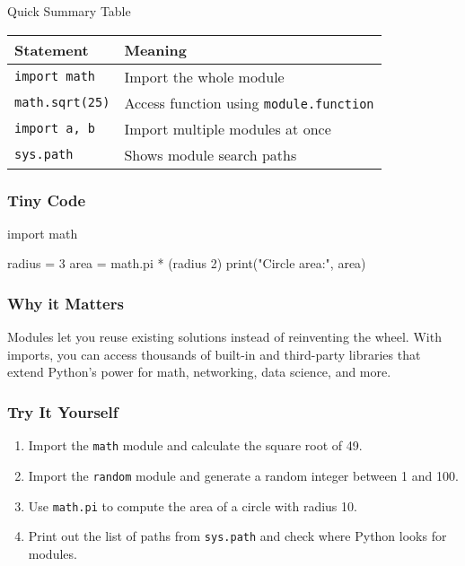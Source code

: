 \documentclass[
  letterpaper,
  DIV=11,
  numbers=noendperiod]{scrreprt}
\newenvironment{Shaded}{\begin{snugshade}}{\end{snugshade}}
\newcommand{\BuiltInTok}[1]{\textcolor[rgb]{0.00,0.23,0.31}{#1}}
\newcommand{\DecValTok}[1]{\textcolor[rgb]{0.68,0.00,0.00}{#1}}
\newcommand{\ImportTok}[1]{\textcolor[rgb]{0.00,0.46,0.62}{#1}}
\newcommand{\NormalTok}[1]{\textcolor[rgb]{0.00,0.23,0.31}{#1}}
\newcommand{\OperatorTok}[1]{\textcolor[rgb]{0.37,0.37,0.37}{#1}}
\newcommand{\StringTok}[1]{\textcolor[rgb]{0.13,0.47,0.30}{#1}}
\providecommand{\tightlist}{%
  \setlength{\itemsep}{0pt}\setlength{\parskip}{0pt}}
\begin{document}
Quick Summary Table

\begin{longtable}[]{@{}ll@{}}
\toprule\noalign{}
Statement & Meaning \\
\midrule\noalign{}
\endhead
\bottomrule\noalign{}
\endlastfoot
\texttt{import\ math} & Import the whole module \\
\texttt{math.sqrt(25)} & Access function using
\texttt{module.function} \\
\texttt{import\ a,\ b} & Import multiple modules at once \\
\texttt{sys.path} & Shows module search paths \\
\end{longtable}

\subsubsection{Tiny Code}\label{tiny-code-40}

\begin{Shaded}
\begin{Highlighting}[]
\ImportTok{import}\NormalTok{ math}

\NormalTok{radius }\OperatorTok{=} \DecValTok{3}
\NormalTok{area }\OperatorTok{=}\NormalTok{ math.pi }\OperatorTok{*}\NormalTok{ (radius  }\DecValTok{2}\NormalTok{)}
\BuiltInTok{print}\NormalTok{(}\StringTok{"Circle area:"}\NormalTok{, area)}
\end{Highlighting}
\end{Shaded}

\subsubsection{Why it Matters}\label{why-it-matters-40}

Modules let you reuse existing solutions instead of reinventing the
wheel. With imports, you can access thousands of built-in and
third-party libraries that extend Python's power for math, networking,
data science, and more.

\subsubsection{Try It Yourself}\label{try-it-yourself-40}

\begin{enumerate}
\def\labelenumi{\arabic{enumi}.}
\tightlist
\item
  Import the \texttt{math} module and calculate the square root of 49.
\item
  Import the \texttt{random} module and generate a random integer
  between 1 and 100.
\item
  Use \texttt{math.pi} to compute the area of a circle with radius 10.
\item
  Print out the list of paths from \texttt{sys.path} and check where
  Python looks for modules.
\end{enumerate}
\end{document}
